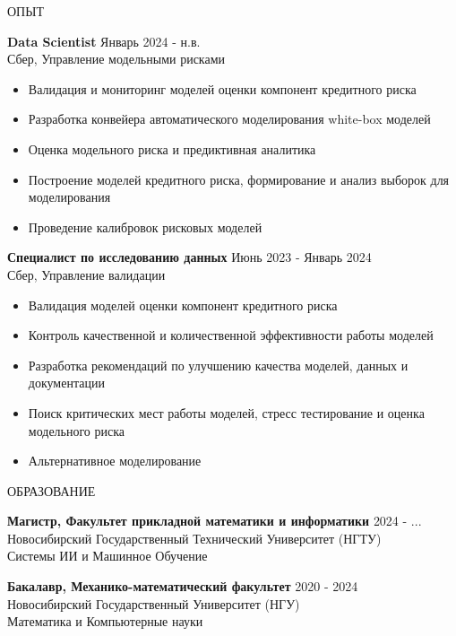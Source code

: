 \documentclass{resume} %
\begin{document}
\begin{rSection}{ОПЫТ} %

\textbf{Data Scientist} \hfill Январь 2024 - н.в. \\ 
Сбер, Управление модельными рисками 
 \begin{itemize}
    \itemsep -3pt {}
\item Валидация и мониторинг моделей оценки компонент кредитного риска
\item Разработка конвейера автоматического моделирования white-box моделей
\item Оценка модельного риска и предиктивная аналитика 
\item Построение моделей кредитного риска, формирование и анализ выборок для моделирования
\item Проведение калибровок рисковых моделей 
 \end{itemize}

\textbf{Специалист по исследованию данных} \hfill Июнь 2023 - Январь 2024\\
Сбер, Управление валидации %
 \begin{itemize}
    \itemsep -3pt {}
\item Валидация моделей оценки компонент кредитного риска
\item Контроль качественной и количественной эффективности работы моделей 
\item Разработка рекомендаций по улучшению качества моделей, данных и документации 
\item Поиск критических мест работы моделей, стресс тестирование и оценка модельного риска
\item Альтернативное моделирование
 \end{itemize}

\end{rSection}

\begin{rSection}{ОБРАЗОВАНИЕ} %

{\bf Магистр, Факультет прикладной математики и информатики} \hfill {2024 - ...} \\
Новосибирский Государственный Технический Университет (НГТУ) \\ %
Системы ИИ и Машинное Обучение

{\bf Бакалавр, Механико-математический факультет} \hfill {2020 - 2024} \\
Новосибирский Государственный Университет (НГУ) \\ %
Математика и Компьютерные науки %

\end{rSection}

\begin{rSection}
{}
\end{rSection}
\end{document}
